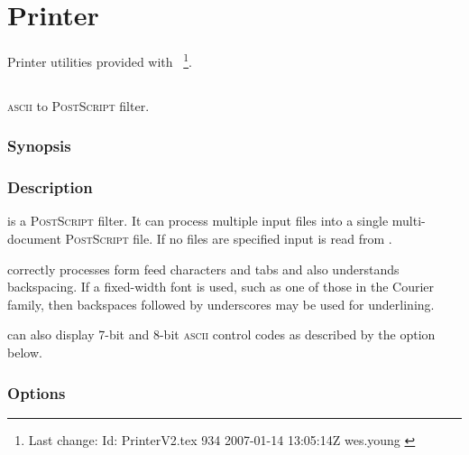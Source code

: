 \chapter{Printer}
\label{Printer}

Printer utilities provided with \aipspp\ \footnote{Last change:
$ $Id: PrinterV2.tex 934 2007-01-14 13:05:14Z wes.young $ $}.


\section{}
\label{lwfa}

\textsc{ascii} to \textsc{PostScript} filter.

\subsection*{Synopsis}

\begin{synopsis}
\end{synopsis}

\subsection*{Description}

 is a \textsc{PostScript} filter.  It can process multiple input
files into a single multi-document \textsc{PostScript} file.  If no files are
specified input is read from .

 correctly processes form feed characters and tabs and also
understands backspacing.  If a fixed-width font is used, such as one of those
in the Courier family, then backspaces followed by underscores may be used for
underlining.

 can also display 7-bit and 8-bit \textsc{ascii} control codes as
described by the  option below.

\subsection*{Options}

